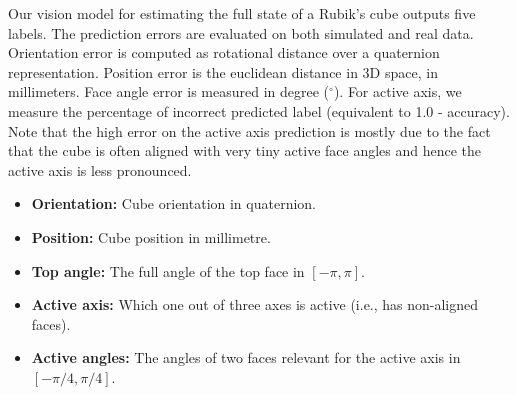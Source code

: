 Our vision model for estimating the full state of a Rubik's cube outputs five labels. The prediction errors are evaluated on both simulated and real data. Orientation error is computed as rotational distance over a quaternion representation. Position error is the euclidean distance in 3D space, in millimeters. Face angle error is measured in degree ($^\circ$). For active axis, we measure the percentage of incorrect predicted label (equivalent to 1.0 - accuracy). Note that the high error on the active axis prediction is mostly due to the fact that the cube is often aligned with very tiny active face angles and hence the active axis is less pronounced.
\begin{itemize}
    \item \textbf{Orientation:} Cube orientation in quaternion.
    \item \textbf{Position:} Cube position in millimetre.
    \item \textbf{Top angle:} The full angle of the top face in $[-\pi, \pi]$.
    \item \textbf{Active axis:} Which one out of three axes is active (i.e., has non-aligned faces).
    \item \textbf{Active angles:} The angles of two faces relevant for the active axis in $[-\pi/4, \pi/4]$.
\end{itemize}

